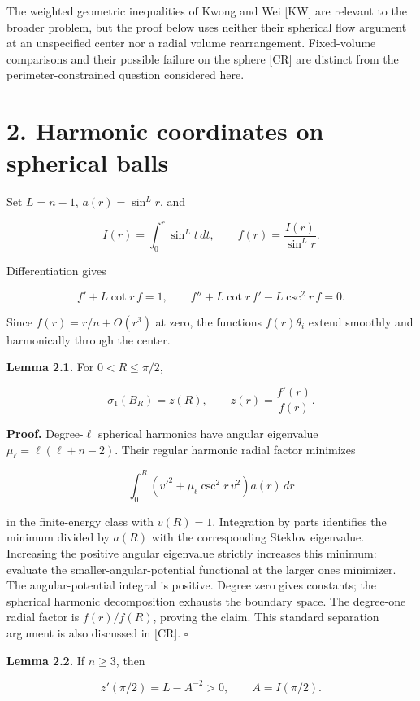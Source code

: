 \documentclass[11pt]{article}
\begin{document}
The weighted geometric inequalities of Kwong and Wei {[}KW{]} are
relevant to the broader problem, but the proof below uses neither their
spherical flow argument at an unspecified center nor a radial volume
rearrangement. Fixed-volume comparisons and their possible failure on
the sphere {[}CR{]} are distinct from the perimeter-constrained question
considered here.

\section{2. Harmonic coordinates on spherical
balls}\label{harmonic-coordinates-on-spherical-balls}

Set \(L=n-1\), \(a(r)=\sin^Lr\), and

\[
I(r)=\int_0^r\sin^Lt\,dt,\qquad f(r)=\frac{I(r)}{\sin^Lr}.
\tag{2.1}
\]

Differentiation gives

\[
f'+L\cot r\,f=1,\qquad
f''+L\cot r\,f'-L\csc^2r\,f=0.
\tag{2.2}
\]

Since \(f(r)=r/n+O(r^3)\) at zero, the functions \(f(r)\theta_i\) extend
smoothly and harmonically through the center.

\textbf{Lemma 2.1.} For \(0<R\leq\pi/2\),

\[
\sigma_1(B_R)=z(R),\qquad z(r)=\frac{f'(r)}{f(r)}.
\tag{2.3}
\]

\textbf{Proof.} Degree-\(\ell\) spherical harmonics have angular
eigenvalue \(\mu_\ell=\ell(\ell+n-2)\). Their regular harmonic radial
factor minimizes

\[
\int_0^R\left(v'^2+\mu_\ell\csc^2r\,v^2\right)a(r)\,dr
\tag{2.4}
\]

in the finite-energy class with \(v(R)=1\). Integration by parts
identifies the minimum divided by \(a(R)\) with the corresponding
Steklov eigenvalue. Increasing the positive angular eigenvalue strictly
increases this minimum: evaluate the smaller-angular-potential
functional at the larger one\textquotesingle s minimizer. The
angular-potential integral is positive. Degree zero gives constants; the
spherical harmonic decomposition exhausts the boundary space. The
degree-one radial factor is \(f(r)/f(R)\), proving the claim. This
standard separation argument is also discussed in {[}CR{]}. \(\square\)

\textbf{Lemma 2.2.} If \(n\geq3\), then

\[
z'(\pi/2)=L-A^{-2}>0,\qquad
A=I(\pi/2).
\tag{2.5}
\]
\end{document}
